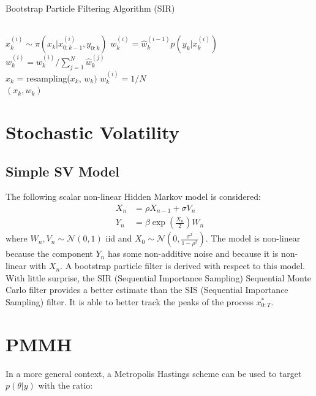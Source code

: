 \documentclass[11pt,a4,twosided,singlespacing,titlepagenumber=on]{scrreprt}
\numberwithin{equation}{chapter} %
\theoremstyle{remark}
\begin{document}
\begin{algorithm}
\caption{Bootstrap Particle Filtering Algorithm (SIR)}\label{euclid}
\begin{algorithmic}[1]
\Procedure{}{}
\\
	\State $x_k^{(i)} \sim \pi(x_k | x_{0:k-1}^{(i)}, y_{0:k})$
	\State $w_k^{(i)} = \hat{w}_k^{(i-1)} p(y_k | x_k^{(i)})$
\\
	\State $w_k^{(i)} = \hat{w}_k^{(i)} / \sum_{j=1}^N \hat{w}_k^{(j)} $
\\
\State $x_k$ = resampling($x_k$, $w_k)$
	\State $w_k^{(i)} = 1 / N$
\\
\EndProcedure
\Return $(x_k, w_k)$

\end{algorithmic}
\end{algorithm}

\newpage
\section{Stochastic Volatility}
\subsection{Simple SV Model}
The following scalar non-linear Hidden Markov model is considered:
\begin{align*}
  X_n &=  \rho X_{n-1} + \sigma V_n\\
  Y_n &=  \beta \exp \left( \frac{X_n}{2} \right) W_n
\end{align*}
where  $W_n, V_n \sim \mathcal{N}(0,1)$ iid and $X_0 \sim \mathcal{N} \left(0, \frac{\sigma^2}{1-\rho^2} \right)$. The model is non-linear because the component $Y_n$ has some non-additive noise and because it is non-linear with $X_n$. A bootstrap particle filter is derived with respect to this model. With little surprise, the SIR (Sequential Importance Sampling) Sequential Monte Carlo filter provides a better estimate than the SIS (Sequential Importance Sampling) filter. It is able to better track the peaks of the process $x^*_{0:T}$.

\section{PMMH}

In a more general context, a Metropolis Hastings scheme can be used to target $p(\theta| y)$ with the ratio:
\end{document}
